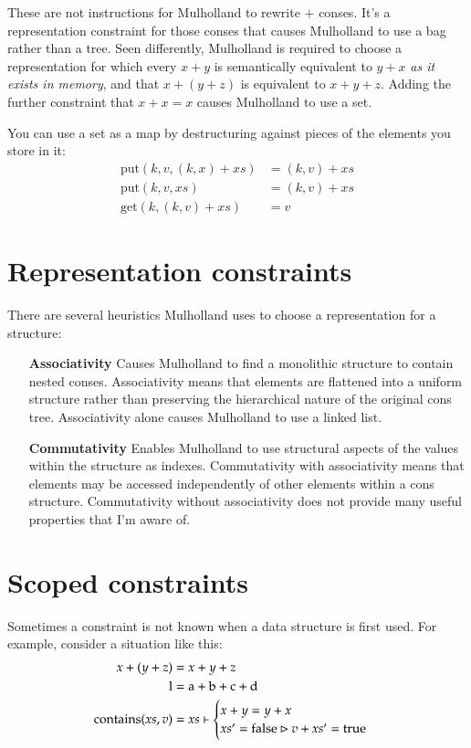 \documentclass{report}
\begin{document}
  These are not instructions for Mulholland to rewrite $+$ conses. It's a representation constraint for those conses that causes Mulholland to use a bag rather than a tree. Seen differently,
  Mulholland is required to choose a representation for which every $x + y$ is semantically equivalent to $y + x$ {\em as it exists in memory}, and that $x + (y + z)$ is equivalent to $x + y +
  z$. Adding the further constraint that $x + x = x$ causes Mulholland to use a set.

  You can use a set as a map by destructuring against pieces of the elements you store in it:
\begin{align*}
\textrm{put}(k, v, (k, x) + xs) & = (k, v) + xs \\
\textrm{put}(k, v, xs)          & = (k, v) + xs \\
\textrm{get}(k, (k, v) + xs)    & = v
\end{align*}

\section{Representation constraints}
    There are several heuristics Mulholland uses to choose a representation for a structure:

\begin{enumerate}
\item[\bf Associativity]
  Causes Mulholland to find a monolithic structure to contain nested conses. Associativity means that elements are flattened into a uniform structure rather than preserving the
  hierarchical nature of the original cons tree. Associativity alone causes Mulholland to use a linked list.

\item[\bf Commutativity]
  Enables Mulholland to use structural aspects of the values within the structure as indexes. Commutativity with associativity means that elements may be accessed independently of other
  elements within a cons structure. Commutativity without associativity does not provide many useful properties that I'm aware of.
\end{enumerate}

\section{Scoped constraints}
    Sometimes a constraint is not known when a data structure is first used. For example, consider a situation like this:
\begin{align*}
x + (y + z)              & = x + y + z \\
\textrm l                & = \textrm a + \textrm b + \textrm c + \textrm d \\
\textrm{contains}(xs, v) & = xs \vdash \begin{cases}
                                         x + y = y + x \\
                                         xs' = \textrm{false} \rhd v + xs' = \textrm{true}
                                       \end{cases}
\end{align*}
\end{document}
